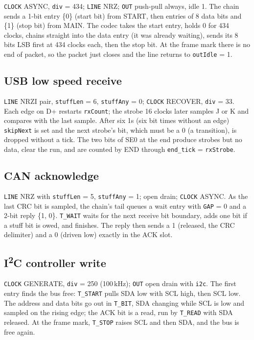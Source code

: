 \documentclass[11pt,a4paper]{article}
\newcommand{\sig}[1]{\texttt{#1}}
\begin{document}
\sig{CLOCK} ASYNC, \sig{div} = 434; \sig{LINE} NRZ; \sig{OUT} push-pull always, idle 1. The chain sends a 1-bit entry \{0\} (start bit) from START, then entries of 8 data bits and \{1\} (stop bit) from MAIN. The codec takes the start entry, holds 0 for 434 clocks, chains straight into the data entry (it was already waiting), sends its 8 bits LSB first at 434 clocks each, then the stop bit. At the frame mark there is no end of packet, so the packet just closes and the line returns to \sig{outIdle} = 1.

\subsection{USB low speed receive}

\sig{LINE} NRZI pair, \sig{stuffLen} = 6, \sig{stuffAny} = 0; \sig{CLOCK} RECOVER, \sig{div} = 33. Each edge on D+ restarts \sig{rxCount}; the strobe 16 clocks later samples J or K and compares with the last sample. After six 1s (six bit times without an edge) \sig{skipNext} is set and the next strobe's bit, which must be a 0 (a transition), is dropped without a tick. The two bits of SE0 at the end produce strobes but no data, clear the run, and are counted by END through \sig{end\_tick} = \sig{rxStrobe}.

\subsection{CAN acknowledge}

\sig{LINE} NRZ with \sig{stuffLen} = 5, \sig{stuffAny} = 1; open drain; \sig{CLOCK} ASYNC. As the last CRC bit is sampled, the chain's tail queues a wait entry with \sig{GAP} = 0 and a 2-bit reply \{1, 0\}. \sig{T\_WAIT} waits for the next receive bit boundary, adds one bit if a stuff bit is owed, and finishes. The reply then sends a 1 (released, the CRC delimiter) and a 0 (driven low) exactly in the ACK slot.

\subsection{I\textsuperscript{2}C controller write}

\sig{CLOCK} GENERATE, \sig{div} = 250 (100\,kHz); \sig{OUT} open drain with \sig{i2c}. The first entry finds the bus free: \sig{T\_START} pulls SDA low with SCL high, then SCL low. The address and data bits go out in \sig{T\_BIT}, SDA changing while SCL is low and sampled on the rising edge; the ACK bit is a read, run by \sig{T\_READ} with SDA released. At the frame mark, \sig{T\_STOP} raises SCL and then SDA, and the bus is free again.
\end{document}
